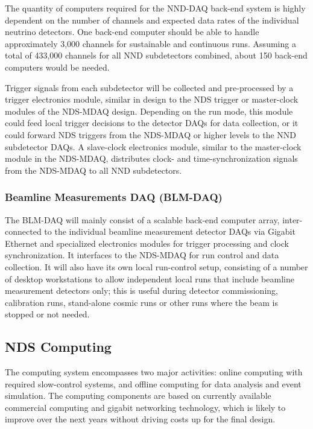 The quantity of computers required for the NND-DAQ back-end system is
highly dependent on the number of channels and expected data rates of
the individual neutrino detectors.  One back-end computer should be
able to handle approximately 3,000 channels for sustainable and
continuous runs. Assuming a total of 433,000 channels for all NND
subdetectors combined, about 150 back-end computers would be needed.

Trigger signals from each subdetector will be collected and
pre-processed by a trigger electronics module, similar in design to
the NDS trigger or master-clock modules of the NDS-MDAQ
design. Depending on the run mode, this module could feed local
trigger decisions to the detector DAQs for data collection, or it
could forward NDS triggers from the NDS-MDAQ or higher levels to the
NND subdetector DAQs.  A slave-clock electronics module, similar to
the master-clock module in the NDS-MDAQ, distributes clock- and
time-synchronization signals from the NDS-MDAQ to all NND
subdetectors.




\subsubsection{Beamline Measurements DAQ (BLM-DAQ)}

The BLM-DAQ will mainly consist of a scalable back-end computer array,
inter-connected to the individual beamline measurement detector DAQs
via Gigabit Ethernet and specialized electronics modules for trigger
processing and clock synchronization. It interfaces to the NDS-MDAQ
for run control and data collection. It will also have its own local
run-control setup, consisting of a number of desktop workstations to
allow independent local runs that include beamline measurement
detectors only; this is useful during detector commissioning,
calibration runs, stand-alone cosmic runs or other runs where the beam
is stopped or not needed.


\subsection{NDS Computing}
\label{cdrsec:nd-gdaq-global-computing}

The computing system encompasses two major activities: online
computing with required slow-control systems, and offline computing
for data analysis and event simulation.  The computing components are
based on currently available commercial computing and gigabit
networking technology, which is likely to improve over the next years
without driving costs up for the final design.

